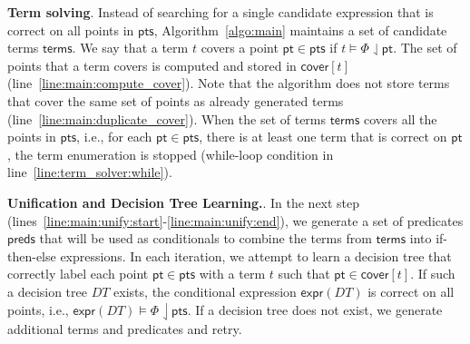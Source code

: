 \documentclass{llncs}
\newcommand\Points{\mathsf{pts}}
\newcommand\Point{\mathsf{pt}}
\newcommand\Predicates{\mathsf{preds}}
\newcommand\Terms{\mathsf{terms}}
\newcommand\Term{t}
\newcommand\Cover{\mathsf{cover}}
\newcommand\Spec{\Phi}
\newcommand\DecisionTree{\mathit{DT}}
\newcommand\DTtoExpr[1]{\mathsf{expr}(#1)}
\renewcommand{\paragraph}[1]{\par\noindent\textbf{#1}.}
\begin{document}
\paragraph{Term solving}
Instead of searching for a single candidate expression that is correct
on all points in $\Points$, Algorithm~\ref{algo:main} maintains a set of
candidate terms $\Terms$.
We say that a term $\Term$ covers a point $\Point \in \Points$ if $\Term
\models \Spec \downharpoonleft \Point$.
The set of points that a term covers is computed and stored in
$\Cover[\Term]$ (line~\ref{line:main:compute_cover}).
Note that the algorithm does not store terms that cover the same set of
points as already generated terms
(line~\ref{line:main:duplicate_cover}).
When the set of terms $\Terms$ covers all the points in $\Points$, i.e., for
each $\Point \in \Points$, there is at least one term that is correct on
$\Point$, the term enumeration is stopped (while-loop condition in
line~\ref{line:term_solver:while}).

\paragraph{Unification and Decision Tree Learning.}
In the next step
(lines~\ref{line:main:unify:start}-\ref{line:main:unify:end}), we
generate a set of predicates $\Predicates$ that will be used as
conditionals to combine the terms from $\Terms$ into if-then-else
expressions.
In each iteration, we attempt to learn a decision tree that correctly
label each point $\Point \in \Points$ with a term $\Term$ such that
$\Point \in \Cover[\Term]$.
If such a decision tree $\DecisionTree$ exists, the conditional
expression $\DTtoExpr{\DecisionTree}$ is correct on all points, i.e.,
$\DTtoExpr{\DecisionTree} \models \Spec \downharpoonleft \Points$.
If a decision tree does not exist, we generate additional terms and
predicates and retry.
\end{document}
